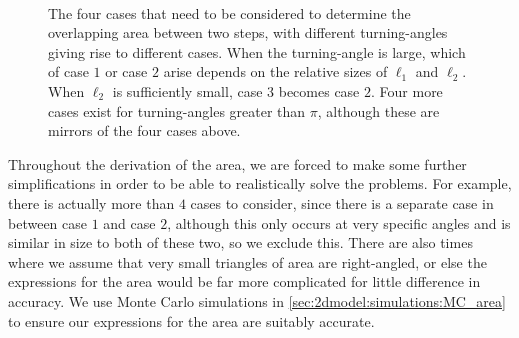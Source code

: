 \begin{figure}[h!]
	\centering
	\hfill
	\\
	\hfill
	\caption[The four different cases for the turning-angle that we consider when determining the area of overlap]{The four cases that need to be considered to determine the overlapping area between two steps, with different turning-angles giving rise to different cases. When the turning-angle is large, which of case $1$ or case $2$ arise depends on the relative sizes of $\ell_1$ and $\ell_2$. When $\ell_2$ is sufficiently small, case $3$ becomes case $2$. Four more cases exist for turning-angles greater than $\pi$, although these are mirrors of the four cases above.}\label{fig:2d_model:firstorder:fourcases}
\end{figure}

Throughout the derivation of the area, we are forced to make some further simplifications in order to be able to realistically solve the problems. For example, there is actually more than $4$ cases to consider, since there is a separate case in between case $1$ and case $2$, although this only occurs at very specific angles and is similar in size to both of these two, so we exclude this. There are also times where we assume that very small triangles of area are right-angled, or else the expressions for the area would be far more complicated for little difference in accuracy. We use Monte Carlo simulations in \cref{sec:2dmodel:simulations:MC_area} to ensure our expressions for the area are suitably accurate. 


